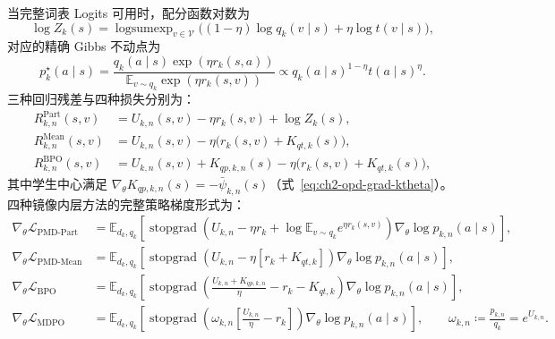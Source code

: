 \documentclass[lang=cn,scheme=chinese,openany]{elegantbook}
\newcommand{\sg}{\operatorname{stopgrad}}
\begin{document}
当完整词表 Logits 可用时，配分函数对数为
\begin{equation}
\log Z_k(s)=\operatorname{logsumexp}_{v\in\mathcal V}
\bigl((1-\eta)\log q_k(v\mid s)+\eta\log t(v\mid s)\bigr),
\label{eq:ch2-opd-full-logz}
\end{equation}
对应的精确 Gibbs 不动点为
\begin{equation}
\label{eq:ch2-opd-common-mirror-solution}
p^{\star}_{k}(a\mid s)
=\frac{q_k(a\mid s)\exp(\eta r_k(s,a))}
{\mathbb E_{v\sim q_k}\exp(\eta r_k(s,v))}
\propto q_k(a\mid s)^{1-\eta}t(a\mid s)^{\eta}.
\end{equation}
三种回归残差与四种损失分别为：
\begin{align}
R_{k,n}^{\mathrm{Part}}(s,v)&=U_{k,n}(s,v)-\eta r_k(s,v)+\log Z_k(s),
\label{eq:ch2-opd-full-part-simplified}\\
R_{k,n}^{\mathrm{Mean}}(s,v)&=U_{k,n}(s,v)-\eta\bigl(r_k(s,v)+K_{qt,k}(s)\bigr),
\label{eq:ch2-opd-full-mean-simplified}\\
R_{k,n}^{\mathrm{BPO}}(s,v)&=U_{k,n}(s,v)+K_{qp,k,n}(s)-\eta\bigl(r_k(s,v)+K_{qt,k}(s)\bigr),
\label{eq:ch2-opd-full-bpo-residual,eq:ch2-opd-full-bpo-simplified,eq:ch2-opd-full-mdpo-simplified}
\end{align}
其中学生中心满足 $\nabla_\theta K_{qp,k,n}(s)=-\bar\psi_{k,n}(s)$（式~\eqref{eq:ch2-opd-grad-ktheta}）。四种镜像内层方法的完整策略梯度形式为：
\begin{align}
\nabla_\theta\mathcal L_{\mathrm{PMD\text{-}Part}}
&=\mathbb E_{d_k,q_k}\!\left[\sg\!\left(
U_{k,n}-\eta r_k+\log\mathbb E_{v\sim q_k}e^{\eta r_k(s,v)}
\right)\nabla_\theta\log p_{k,n}(a\mid s)\right],
\label{eq:ch2-opd-pg-pmd-part}\\
\nabla_\theta\mathcal L_{\mathrm{PMD\text{-}Mean}}
&=\mathbb E_{d_k,q_k}\!\left[\sg\!\left(
U_{k,n}-\eta[r_k+K_{qt,k}]\right)\nabla_\theta\log p_{k,n}(a\mid s)\right],
\label{eq:ch2-opd-pg-pmd-mean}\\
\nabla_\theta\mathcal L_{\mathrm{BPO}}
&=\mathbb E_{d_k,q_k}\!\left[\sg\!\left(
\frac{U_{k,n}+K_{qp,k,n}}\eta-r_k-K_{qt,k}\right)\nabla_\theta\log p_{k,n}(a\mid s)\right],
\label{eq:ch2-opd-full-bpo-gradient-simplified,eq:ch2-opd-bpo-descent-expanded,eq:ch2-opd-grad-ktheta,eq:ch2-opd-pg-bpo}\\
\nabla_\theta\mathcal L_{\mathrm{MDPO}}
&=\mathbb E_{d_k,q_k}\!\left[\sg\!\left(
\omega_{k,n}\left[\frac{U_{k,n}}\eta-r_k\right]\right)
\nabla_\theta\log p_{k,n}(a\mid s)\right],\qquad
\omega_{k,n}\coloneqq\frac{p_{k,n}}{q_k}=e^{U_{k,n}}.
\label{eq:ch2-opd-pg-mdpo,eq:ch2-omega-exp-u}
\end{align}
\end{document}
